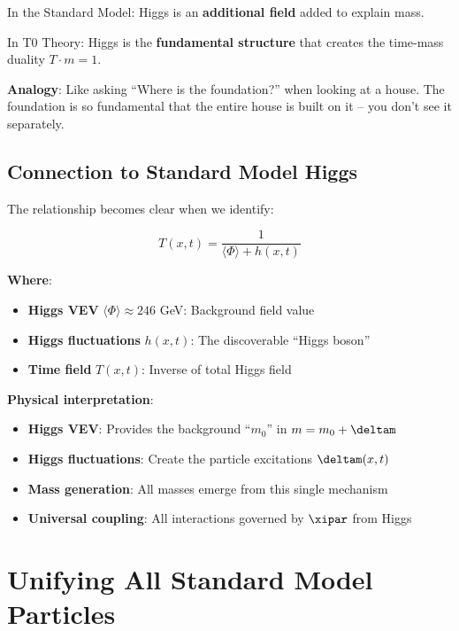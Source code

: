 	\begin{tcolorbox}[colback=purple!5!white,colframe=purple!75!black,title=Higgs Integration in T0 Theory]
		In the Standard Model: Higgs is an \textbf{additional field} added to explain mass.
		
		In T0 Theory: Higgs is the \textbf{fundamental structure} that creates the time-mass duality $T \cdot m = 1$.
		
		\textbf{Analogy}: Like asking ``Where is the foundation?'' when looking at a house. The foundation is so fundamental that the entire house is built on it -- you don't see it separately.
	\end{tcolorbox}
	
	\subsection{Connection to Standard Model Higgs}
	
	The relationship becomes clear when we identify:
	
	\begin{equation}
		T(x,t) = \frac{1}{\langle\Phi\rangle + h(x,t)}
	\end{equation}
	
	\textbf{Where}:
	\begin{itemize}
		\item \textbf{Higgs VEV} $\langle\Phi\rangle \approx 246$ GeV: Background field value
		\item \textbf{Higgs fluctuations} $h(x,t)$: The discoverable ``Higgs boson''
		\item \textbf{Time field} $T(x,t)$: Inverse of total Higgs field
	\end{itemize}
	
	\textbf{Physical interpretation}:
	\begin{itemize}
		\item \textbf{Higgs VEV}: Provides the background ``$m_0$'' in $m = m_0 + \deltam$
		\item \textbf{Higgs fluctuations}: Create the particle excitations $\deltam(x,t)$
		\item \textbf{Mass generation}: All masses emerge from this single mechanism
		\item \textbf{Universal coupling}: All interactions governed by $\xipar$ from Higgs
	\end{itemize}
	
	\section{Unifying All Standard Model Particles}
	
